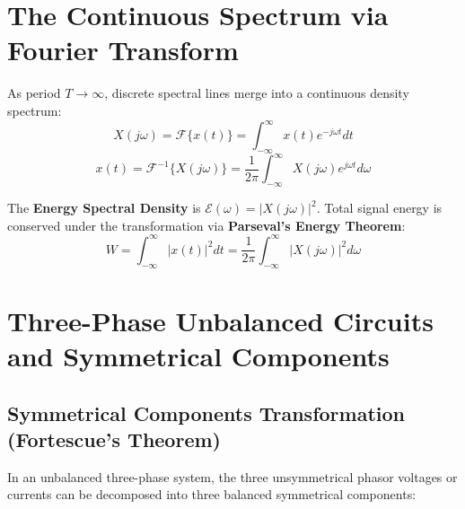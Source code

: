 \documentclass[12pt,a4paper]{article}
\begin{document}
\section{The Continuous Spectrum via Fourier Transform}

\begin{tcolorbox}[defbox, title={\textbf{Continuous Fourier Transform Pair}}]
As period $T \to \infty$, discrete spectral lines merge into a continuous density spectrum:
\begin{equation}
  X(j\omega) = \mathcal{F}\{x(t)\} = \int_{-\infty}^\infty x(t) e^{-j\omega t} dt
\end{equation}
\begin{equation}
  x(t) = \mathcal{F}^{-1}\{X(j\omega)\} = \frac{1}{2\pi} \int_{-\infty}^\infty X(j\omega) e^{j\omega t} d\omega
\end{equation}
\end{tcolorbox}
\par\vspace{4pt}\noindent
The \textbf{Energy Spectral Density} is $\mathcal{E}(\omega) = |X(j\omega)|^2$. Total signal energy is conserved under the transformation via \textbf{Parseval's Energy Theorem}:
\begin{equation}
  W = \int_{-\infty}^\infty |x(t)|^2 dt = \frac{1}{2\pi} \int_{-\infty}^\infty |X(j\omega)|^2 d\omega
\end{equation}

\section{Three-Phase Unbalanced Circuits and Symmetrical Components}

\subsection{Symmetrical Components Transformation (Fortescue's Theorem)}
In an unbalanced three-phase system, the three unsymmetrical phasor voltages or currents can be decomposed into three balanced symmetrical components:
\end{document}
